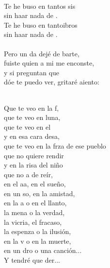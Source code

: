 \begin{cancion}%
	    \\
	Te he buso en tantos sis \\
	sin haar nada de . \\
	Te he buso en tantoibros\\
	sin haar nada de . \\
\jump\\
	Pero un da dejé de barte, \\
	fuiste  quien a mi me enconste, \\
	y si  preguntan que \\
	dóe te puedo ver, gritaré aiento:\\\jump\\
	\begin{chorus}%
	Que te veo en la f, \\
	que te veo en luna,\\
	que te veo en el  \\
	y en esa cara desa,\\
	que te veo en la frza de ese pueblo\\
	que no  quiere rendir\\
	y en la risa del niño \\
	que no a de reír,\\
	en el aa, en el sueño, \\
	en un so, en la amistad,\\
	en la a o en el llanto, \\
	la mena o la verdad,\\
	la vicria, el fracaso, \\
	la espenza o la ilusión,\\
	en la v o en la muerte, \\
	en un dro o una canción...\\
	Y tendré que der...\\

\end{chorus}
\end{cancion}
